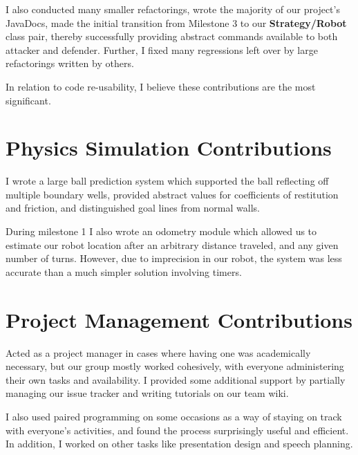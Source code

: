 \documentclass[a4paper,11pt]{article}
\begin{document}
I also conducted many smaller refactorings, wrote the majority of our project's JavaDocs, made the initial transition from Milestone 3 to our \textbf{Strategy/Robot} class pair, thereby successfully providing abstract commands available to both attacker and defender. Further, I fixed many regressions left over by large refactorings written by others.

In relation to code re-usability, I believe these contributions are the most significant. 


\section{Physics Simulation Contributions}

I wrote a large ball prediction system which supported the ball reflecting off multiple boundary wells, provided abstract values for coefficients of restitution and friction, and distinguished goal lines from normal walls.

During milestone 1 I also wrote an odometry module which allowed us to estimate our robot location after an arbitrary distance traveled, and any given number of turns. However, due to imprecision in our robot, the system was less accurate than a much simpler solution involving timers.


\section{Project Management Contributions}

Acted as a project manager in cases where having one was academically necessary, but our group mostly worked cohesively, with everyone administering their own tasks and availability. I provided some additional support by partially managing our issue tracker and writing tutorials on our team wiki.

I also used paired programming on some occasions as a way of staying on track with everyone's activities, and found the process surprisingly useful and efficient. In addition, I worked on other tasks like presentation design and speech planning.
\end{document}
